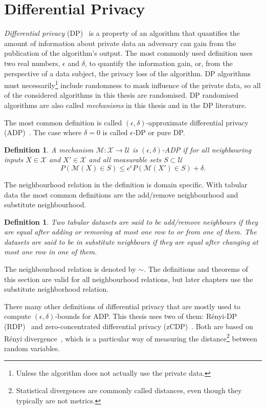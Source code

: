 \documentclass[english,twoside,openright]{HYgraduMLDS}
\newtheorem{definition}[lemma]{Definition}
\newcommand{\calm}{{\mathcal{M}}}
\newcommand{\calx}{{\mathcal{X}}}
\newcommand{\calu}{{\mathcal{U}}}
\begin{document}
\section{Differential Privacy}\label{DP_background}
\emph{Differential privacy} (DP)~\cite{DMN06, DwR14} is a property of
an algorithm that quantifies the
amount of information about private data an adversary can gain from the 
publication of the algorithm's output.
The most commonly used definition uses two real numbers, 
\(\epsilon\) and \(\delta\), to quantify the information gain, or, from the 
perspective of a data subject, the privacy loss of the algorithm.
DP algorithms must necessarily\footnote{Unless the algorithm does not
actually use the private data.} include randomness to mask influence of the
private data, so all of the considered algorithms in this thesis are randomised.
DP randomised algorithms are also called \emph{mechanisms} in this thesis and in the
DP literature.

The most common definition is called \((\epsilon, \delta)\)-approximate
differential privacy (ADP)~\cite{DKM06, DwR14}.
The case where \(\delta = 0\) is called \(\epsilon\)-DP or 
pure DP.

\begin{definition}\label{ADP-definition}
    A mechanism \(\calm\colon \calx \to \calu\) is \((\epsilon, \delta)\)-ADP if
    for all neighbouring inputs \(X\in \calx\) and \(X'\in \calx\) and
    all measurable sets \(S \subset \calu\)
    \[
        P(\calm(X)\in S) \leq e^\epsilon P(\calm(X')\in S) + \delta.
    \]
\end{definition}

The neighbourhood relation in the definition is domain specific. With tabular 
data the most common definitions are the add/remove neighbourhood and 
substitute neighbourhood.
\begin{definition}
    Two tabular datasets are said to be add/remove neighbours if they are equal 
    after adding or removing at most one row to or from one of them. The datasets 
    are said to be in substitute neighbours if they are equal after 
    changing at most one row in one of them.
\end{definition}
The neighbourhood relation is denoted by \(\sim\). The definitions and 
theorems of this section are valid for all neighbourhood relations, but later
chapters use the substitute neighborhood relation.

There many other definitions of differential privacy that are mostly used
to compute \((\epsilon, \delta)\)-bounds for ADP. This thesis uses two of them: 
Rényi-DP (RDP)~\cite{Mironov17} and 
zero-concentrated differential privacy (zCDP)~\cite{BuS16}. Both are based 
on Rényi divergence~\cite{Mironov17}, which is a particular way of 
measuring the distance\footnote{
  Statistical divergences are commonly called distances, even though they
  typically are not metrics.
} between random variables.
\end{document}
